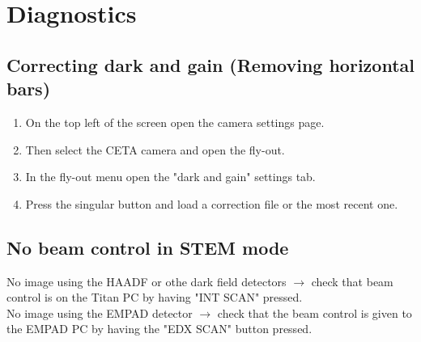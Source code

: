 \documentclass[a4paper]{scrartcl}
\begin{document}
\section*{Diagnostics}
\subsection*{Correcting dark and gain (Removing horizontal bars)}
\begin{enumerate}
    \item On the top left of the screen open the camera settings page.
    \item Then select the CETA camera and open the fly-out.
    \item In the fly-out menu open the "dark and gain" settings tab.
    \item Press the singular button and load a correction file or the most recent one.    
\end{enumerate}

\subsection*{No beam control in STEM mode}
No image using the HAADF or othe dark field detectors $\rightarrow$ check that beam control is on the Titan PC by having "INT SCAN" pressed.\\
No image using the EMPAD detector $\rightarrow$ check that the beam control is given to the EMPAD PC by having the "EDX SCAN" button pressed.\\
\end{document}
